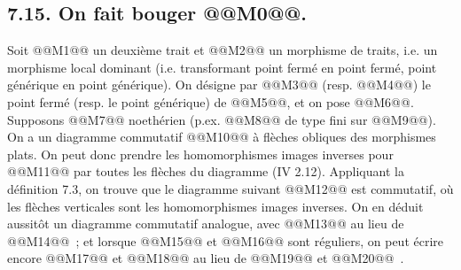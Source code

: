 
\subsection*{7.15. On fait bouger @@M0@@.}
Soit @@M1@@ un deuxième trait et
@@M2@@
un morphisme de traits, i.e. un morphisme local dominant (i.e. transformant point fermé en point fermé, point générique en point générique). On désigne par @@M3@@ (resp. @@M4@@) le point fermé (resp. le point générique) de @@M5@@, et on pose @@M6@@. Supposons @@M7@@ noethérien (p.ex. @@M8@@ de type fini sur @@M9@@). On a un diagramme commutatif
@@M10@@
à flèches obliques des morphismes plats. On peut donc prendre les homomorphismes images inverses pour @@M11@@ par toutes les flèches du diagramme (IV 2.12). Appliquant la définition 7.3, on trouve que le diagramme suivant
@@M12@@
est commutatif, où les flèches verticales sont les homomorphismes images inverses. On en déduit aussitôt un diagramme commutatif analogue, avec @@M13@@ au lieu de @@M14@@~; et lorsque @@M15@@ et @@M16@@ sont réguliers, on peut écrire encore @@M17@@ et @@M18@@ au lieu de @@M19@@ et @@M20@@~.

